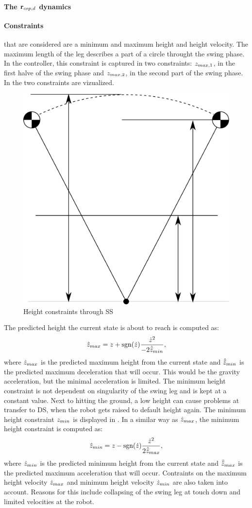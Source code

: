 \paragraph{The $\mathbf{r}_{cop,d}$ dynamics}

\paragraph{Constraints} that are considered are a minimum and maximum height and height velocity. The maximum length of the leg describes a part of a circle throught the swing phase. In the controller, this constraint is captured in two constraints: $z_{max,1}$, in the first halve of the swing phase and $z_{max,2}$, in the second part of the swing phase. In  the two constraints are vizualized. 
\begin{figure}[h]
\centering
  \includegraphics[width=.3\linewidth]{STYLESTUFF/heightconstraints.png}
   \caption{Height constraints through \ac{SS}}
    \label{fig:heightconstraints}
\end{figure} 
The predicted height the current state is about to reach is computed as:
\begin{equation}
	\hat{z}_{max} = z + \operatorname{sgn}(\dot{z})\frac{\dot{z}^2}{-2\hat{\ddot{z}}_{min}},
\end{equation}
where $\hat{z}_{max}$ is the predicted maximum height from the current state and $\hat{\ddot{z}}_{min}$ is the predicted maximum deceleration that will occur. This would be the gravity acceleration, but the minimal acceleration is limited. 
\paraskip
The minimum height constraint is not dependent on singularity of the swing leg and is kept at a constant value. Next to hitting the ground, a low height can cause problems at transfer to \ac{DS}, when the robot gets raised to default height again. The minimum height constraint $z_{min}$ is displayed in . In a similar way as $\hat{z}_{max}$, the minimum height constraint is computed as:
\begin{equation}
	\hat{z}_{min} = z - \operatorname{sgn}(\dot{z})\frac{\dot{z}^2}{2\hat{\ddot{z}}_{max}},
\end{equation}
where $\hat{z}_{min}$ is the predicted minimum height from the current state and $\hat{\ddot{z}}_{max}$ is the predicted maximum acceleration that will occur.
\paraskip
Contraints on the maximum height velocity $\dot{z}_{max}$ and minimum height velocity $\dot{z}_{min}$ are also taken into account. Reasons for this include collapsing of the swing leg at touch down and limited velocities at the robot. 



